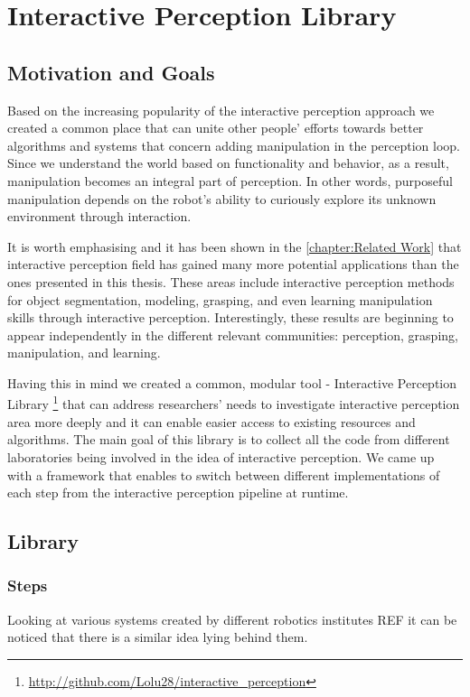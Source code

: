 \chapter{Interactive Perception Library}
\label{chapter:Interactive Perception Library}


\section{Motivation and Goals}
Based on the increasing popularity of the interactive perception approach we created a common place that can unite other people' efforts towards better algorithms and systems that concern adding manipulation in the perception loop. Since we understand the world based on functionality and behavior, as a result, manipulation becomes an integral part of perception. In other words, purposeful manipulation depends on the robot's ability to curiously explore its unknown environment through interaction. 

It is worth emphasising and it has been shown in the \ref{chapter:Related Work} that interactive perception field has gained many more potential applications than the ones presented in this thesis. These areas include interactive perception methods for object segmentation, modeling, grasping, and even learning manipulation skills through interactive perception. Interestingly, these results are beginning to appear independently in the different relevant communities: perception, grasping, manipulation, and learning.

Having this in mind we created a common, modular tool - Interactive Perception Library \footnote{\url{http://github.com/Lolu28/interactive_perception}} that can address researchers' needs to investigate interactive perception area more deeply and it can enable easier access to existing resources and algorithms. The main goal of this library is to collect all the code from different laboratories being involved in the idea of interactive perception. We came up with a framework that enables to switch between different implementations of each step from the interactive perception pipeline at runtime. 


\section{Library}
\subsection{Steps}
Looking at various systems created by different robotics institutes REF it can be noticed that there is a similar idea lying behind them.  

